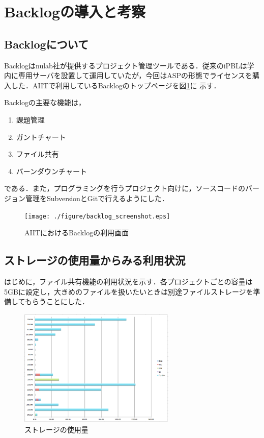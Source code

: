 \documentclass[submit,techreq,noauthor]{ipsj}
\begin{document}
\section{Backlogの導入と考察}

\subsection{Backlogについて}
Backlogはnulab社が提供するプロジェクト管理ツールである．従来のiPBLは学
内に専用サーバを設置して運用していたが，今回はASPの形態でライセンスを購
入した．AIITで利用しているBacklogのトップページを図\ref{fig:backlog}に
示す．

Backlogの主要な機能は，

\begin{enumerate}
 \item 課題管理
 \item ガントチャート
 \item ファイル共有
 \item バーンダウンチャート
\end{enumerate}

である．また，プログラミングを行うプロジェクト向けに，ソースコードのバー
ジョン管理をSubversionとGitで行えるようにした．

\begin{figure}[tb]
\begin{center}
\texttt{[image: ./figure/backlog\_screenshot.eps]}
\end{center}
\caption{AIITにおけるBacklogの利用画面}
\label{fig:backlog}
\end{figure}

\subsection{ストレージの使用量からみる利用状況}
はじめに，ファイル共有機能の利用状況を示す．各プロジェクトごとの容量は
5GBに設定し，大きめのファイルを扱いたいときは別途ファイルストレージを準
備してもらうことにした．

\begin{figure}[tb]
\begin{center}
\includegraphics[width=7.5cm]{./figure/fig1.eps}
\end{center}
\caption{ストレージの使用量}
\label{fig:fig1}
\end{figure}
\end{document}
